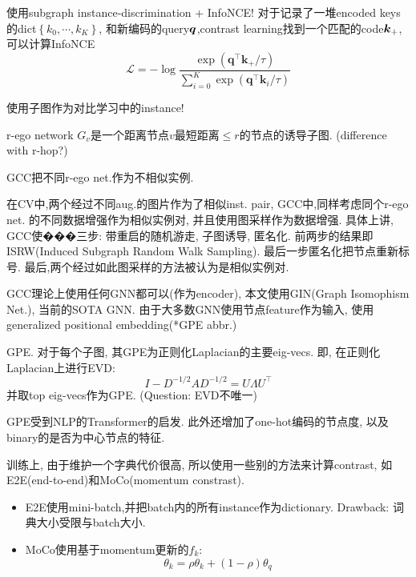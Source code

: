 \documentclass{article}
\begin{document}
\begin{flushleft}

 使用subgraph instance-discrimination + InfoNCE! 对于记录了一堆encoded keys的dict$\left\{k_{0}, \cdots, k_{K}\right\}$, 和新编码的query$\boldsymbol{q}$,contrast learning找到一个匹配的code$\boldsymbol{k}_+$,可以计算InfoNCE
\begin{equation}
    \mathcal{L}=-\log \frac{\exp \left(\boldsymbol{q}^{\top} \boldsymbol{k}_{+} / \tau\right)}{\sum_{i=0}^{K} \exp \left(\boldsymbol{q}^{\top} \boldsymbol{k}_{i} / \tau\right)}
\end{equation}

使用子图作为对比学习中的instance!
\begin{definition}
    r-ego network $G_v$是一个距离节点$v$最短距离$\le r$的节点的诱导子图. (difference with r-hop?)
\end{definition}
GCC把不同r-ego net.作为不相似实例.

在CV中,两个经过不同aug.的图片作为了相似inst. pair, GCC中,同样考虑同个r-ego net. 的不同数据增强作为相似实例对, 并且使用图采样作为数据增强. 具体上讲, GCC使���三步: 带重启的随机游走, 子图诱导, 匿名化. 前两步的结果即ISRW(Induced Subgraph Random Walk Sampling). 最后一步匿名化把节点重新标号. 最后,两个经过如此图采样的方法被认为是相似实例对.

GCC理论上使用任何GNN都可以(作为encoder), 本文使用GIN(Graph Isomophism Net.), 当前的SOTA GNN. 由于大多数GNN使用节点feature作为输入, 使用generalized positional embedding(*GPE abbr.)

\begin{definition}
    GPE. 对于每个子图, 其GPE为正则化Laplacian的主要eig-vecs. 即, 在正则化Laplacian上进行EVD:
    \begin{equation}
        I-D^{-1 / 2} A D^{-1 / 2}=U \Lambda U^{\top}
    \end{equation}
    并取top eig-vecs作为GPE.
    (Question: EVD不唯一)
\end{definition}

GPE受到NLP的Transformer的启发. 此外还增加了one-hot编码的节点度, 以及binary的是否为中心节点的特征.

训练上, 由于维护一个字典代价很高, 所以使用一些别的方法来计算contrast, 如E2E(end-to-end)和MoCo(momentum constrast). \begin{itemize}
    \item E2E使用mini-batch,并把batch内的所有instance作为dictionary. Drawback: 词典大小受限与batch大小.
    \item MoCo使用基于momentum更新的$f_k$: 
    $$
    \theta_k = \rho \theta_k + (1-\rho)\theta_q
    $$
\end{itemize}

\end{flushleft}
\end{document}
